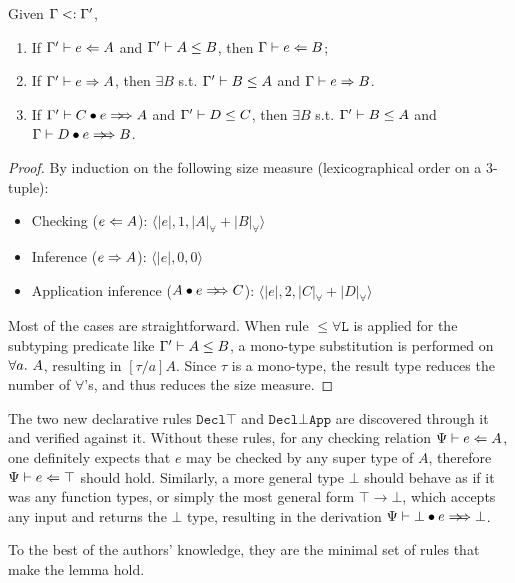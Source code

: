 \begin{lemma}
    Given $\Gamma <: \Gamma'$,
    \begin{enumerate}[1)]
        \item If $\Gamma' \vdash e \Leftarrow A$ and $\Gamma' \vdash A \le B$, then $\Gamma \vdash e \Leftarrow B$;
        \item If $\Gamma' \vdash e \Rightarrow A$, then $\exists B$ s.t. $\Gamma' \vdash B \le A$ and $\Gamma \vdash e \Rightarrow B$.
        \item If $\Gm' \vdash \appInf{C}{e}{A}$ and $\Gamma' \vdash D \le C$, then
            $\exists B$ s.t. $\Gamma' \vdash B \le A$ and $\Gm \vdash \appInf{D}{e}{B}$.
    \end{enumerate}
\end{lemma}

\begin{proof}
    By induction on the following size measure (lexicographical order on a 3-tuple):
    \begin{itemize}
        \item Checking ($e \Leftarrow A$): $\langle |e|, 1, |A|_\forall + |B|_\forall \rangle$
        \item Inference ($e \Rightarrow A$): $\langle |e|, 0, 0 \rangle$
        \item Application inference ($\appInf{A}{e}{C}$): $\langle |e|, 2, |C|_\forall + |D|_\forall \rangle$
    \end{itemize}
    Most of the cases are straightforward.
    When rule $\mathtt{{\le}\forall L}$ is applied for the subtyping predicate
    like $\Gamma' \vdash A \le B$,
    a mono-type substitution is performed on $\all A$,
    resulting in $[\tau/a]A$.
    Since $\tau$ is a mono-type, the result type reduces the number of $\forall$'s,
    and thus reduces the size measure.
\end{proof}

The two new declarative rules $\mathtt{Decl\top}$ and $\mathtt{Decl{\bot}App}$ are
discovered through it and verified against it.
Without these rules, for any checking relation $\Psi \vdash e \Leftarrow A$,
one definitely expects that $e$ may be checked by any super type of $A$,
therefore $\Psi \vdash e \Leftarrow \top$ should hold.
Similarly, a more general type $\bot$ should behave as if it was any function types,
or simply the most general form $\top \to \bot$,
which accepts any input and returns the $\bot$ type,
resulting in the derivation $\Psi \vdash \appInf{\bot}{e}{\bot}$.


To the best of the authors' knowledge,
they are the minimal set of rules that make the lemma hold.


